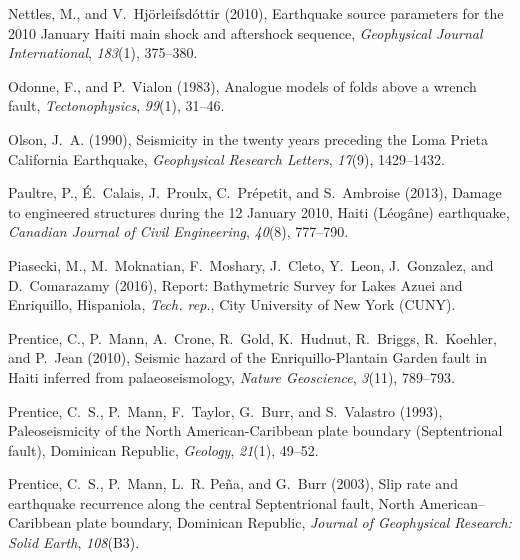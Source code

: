 \documentclass[linenumbers,draft]{agujournal}
\begin{document}
\begin{thebibliography}{65}
Nettles, M., and V.~Hj{\"o}rleifsd{\'o}ttir (2010), Earthquake source
  parameters for the 2010 {January Haiti} main shock and aftershock sequence,
  \textit{Geophysical Journal International}, \textit{183}(1), 375--380.

Odonne, F., and P.~Vialon (1983), Analogue models of folds above a wrench
  fault, \textit{Tectonophysics}, \textit{99}(1), 31--46.

Olson, J.~A. (1990), {Seismicity in the twenty years preceding the Loma Prieta
  California Earthquake}, \textit{Geophysical Research Letters},
  \textit{17}(9), 1429--1432.

Paultre, P., {\'E}.~Calais, J.~Proulx, C.~Pr{\'e}petit, and S.~Ambroise (2013),
  {Damage to engineered structures during the 12 January 2010, Haiti
  (L{\'e}og{\^a}ne) earthquake}, \textit{Canadian Journal of Civil
  Engineering}, \textit{40}(8), 777--790.

Piasecki, M., M.~Moknatian, F.~Moshary, J.~Cleto, Y.~Leon, J.~Gonzalez, and
  D.~Comarazamy (2016), Report: {Bathymetric Survey for Lakes Azuei and
  Enriquillo, Hispaniola}, \textit{Tech. rep.}, City University of New York
  (CUNY).

Prentice, C., P.~Mann, A.~Crone, R.~Gold, K.~Hudnut, R.~Briggs, R.~Koehler, and
  P.~Jean (2010), Seismic hazard of the {Enriquillo-Plantain Garden fault in
  Haiti} inferred from palaeoseismology, \textit{Nature Geoscience},
  \textit{3}(11), 789--793.

Prentice, C.~S., P.~Mann, F.~Taylor, G.~Burr, and S.~Valastro (1993),
  {Paleoseismicity of the North American-Caribbean plate boundary
  (Septentrional fault), Dominican Republic}, \textit{Geology}, \textit{21}(1),
  49--52.

Prentice, C.~S., P.~Mann, L.~R. Pe{\~n}a, and G.~Burr (2003), {Slip rate and
  earthquake recurrence along the central Septentrional fault, North
  American--Caribbean plate boundary, Dominican Republic}, \textit{Journal of
  Geophysical Research: Solid Earth}, \textit{108}(B3).


\end{thebibliography}
\end{document}
